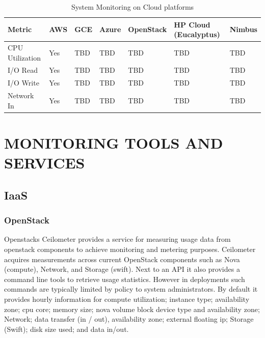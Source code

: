 \documentclass{sig-alternate-05-2015}
\begin{document}
\begin{table}[htb]
\caption{System Monitoring on Cloud platforms}
\begin{scriptsize}
\label{T:SMmetrics}
\bigskip
\begin{center}
\begin{tabular}{p{}p{}p{}p{}p{}p{}p{}}
Metric & AWS & GCE & Azure & OpenStack & HP Cloud (Eucalyptus) & Nimbus \\
\hline
CPU Utilization & Yes & TBD & TBD & TBD & TBD & TBD \\
\hline
I/O Read & Yes & TBD & TBD & TBD & TBD & TBD \\
\hline
I/O Write & Yes & TBD & TBD & TBD & TBD & TBD \\
\hline
Network In & Yes & TBD & TBD & TBD & TBD & TBD \\
\hline
\end{tabular}
\end{center}
\end{scriptsize}
\end{table}

\section{MONITORING TOOLS AND SERVICES}\label{S:tools}

\subsection{IaaS}

\subsubsection{OpenStack}


Openstacks Ceilometer provides a service for measuring usage data from openstack components to achieve monitoring and metering purposes. Ceilometer acquires measurements across current OpenStack components such as Nova (compute), Network, and Storage (swift). Next to an API it also provides a command line tools to retrieve usage statistics. However in deployments such commands are typically limited by policy to system administrators. By default it provides hourly information for compute utilization; instance type; availability zone; cpu core; memory size; nova volume block device type and availability zone; Network; data transfer (in / out), availability zone; external floating ip; Storage (Swift); disk size used; and data in/out.
\end{document}
